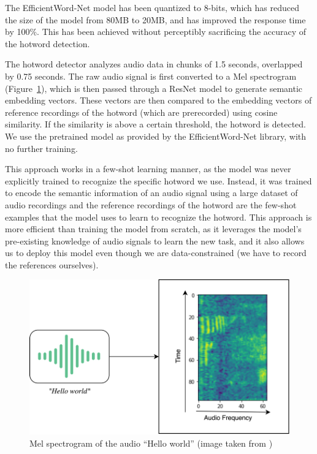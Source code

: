 \documentclass[a4paper,12pt,twoside]{ThesisStyle}
\begin{document}
The EfficientWord-Net model has been quantized to 8-bits, which has reduced the size of the model from 80MB to 20MB, and has improved the response time by 100\%. This has been achieved without perceptibly sacrificing the accuracy of the hotword detection.

The hotword detector analyzes audio data in chunks of 1.5 seconds, overlapped by 0.75 seconds. The raw audio signal is first converted to a Mel spectrogram (Figure~\ref{fig:mel_spectrogram}), which is then passed through a ResNet \cite{He2015DeepResidualLearningImage} model to generate semantic embedding vectors. These vectors are then compared to the embedding vectors of reference recordings of the hotword (which are prerecorded) using cosine similarity. If the similarity is above a certain threshold, the hotword is detected.
We use the pretrained model as provided by the EfficientWord-Net library, with no further training.

This approach works in a few-shot learning manner, as the model was never explicitly trained to recognize the specific hotword we use. Instead, it was trained to encode the semantic information of an audio signal using a large dataset of audio recordings and the reference recordings of the hotword are the few-shot examples that the model uses to learn to recognize the hotword. This approach is more efficient than training the model from scratch, as it leverages the model's pre-existing knowledge of audio signals to learn the new task, and it also allows us to deploy this model even though we are data-constrained (we have to record the references ourselves).

\begin{figure}[htb]
  \centering
  \includegraphics[width=1\textwidth]{img/MelSpectrogram.png}
  \caption{Mel spectrogram of the audio ``Hello world'' (image taken from \cite{Chidhambararajan2022EfficientWordNet})}
  \label{fig:mel_spectrogram}
\end{figure}
\end{document}

